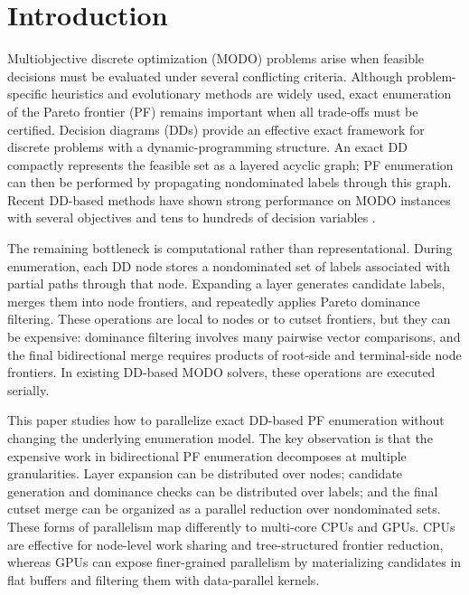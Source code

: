 
\section{Introduction}
Multiobjective discrete optimization (MODO) \cite{ehrgott2005multicriteria,ehrgott2016exact,miettinen1999nonlinear} problems arise when feasible decisions must be evaluated under several conflicting criteria. Although problem-specific heuristics \cite{Vianna2014AMG} and evolutionary methods \cite{Deb2002AFA} are widely used, exact enumeration of the Pareto frontier (PF) remains important when all trade-offs must be certified. Decision diagrams (DDs) \cite{bergman2016decision} provide an effective exact framework for discrete problems with a dynamic-programming structure. An exact DD compactly represents the feasible set as a layered acyclic graph; PF enumeration can then be performed by propagating nondominated labels through this graph. Recent DD-based methods have shown strong performance on MODO instances with several objectives and tens to hundreds of decision variables \cite{bergman2022network}.

The remaining bottleneck is computational rather than representational. During enumeration, each DD node stores a nondominated set of labels associated with partial paths through that node. Expanding a layer generates candidate labels, merges them into node frontiers, and repeatedly applies Pareto dominance filtering. These operations are local to nodes or to cutset frontiers, but they can be expensive: dominance filtering involves many pairwise vector comparisons, and the final bidirectional merge requires products of root-side and terminal-side node frontiers. In existing DD-based MODO solvers, these operations are executed serially.

This paper studies how to parallelize exact DD-based PF enumeration without changing the underlying enumeration model. The key observation is that the expensive work in bidirectional PF enumeration decomposes at multiple granularities. Layer expansion can be distributed over nodes; candidate generation and dominance checks can be distributed over labels; and the final cutset merge can be organized as a parallel reduction over nondominated sets. These forms of parallelism map differently to multi-core CPUs and GPUs. CPUs are effective for node-level work sharing and tree-structured frontier reduction, whereas GPUs can expose finer-grained parallelism by materializing candidates in flat buffers and filtering them with data-parallel kernels.

